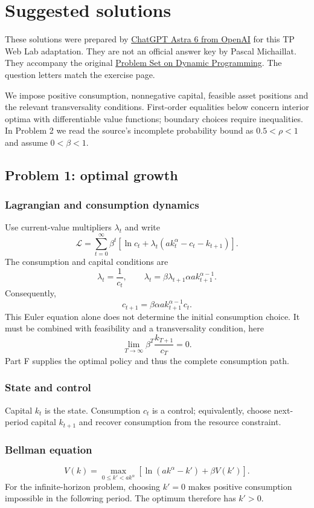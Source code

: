 \usepackage{hyperref}
\renewcommand{\thesubsubsection}{\Alph{subsubsection}}
\section*{Suggested solutions}
These solutions were prepared by \href{https://openai.com/index/gpt-6-astra/}{ChatGPT Astra 6 from OpenAI} for this TP Web Lab adaptation. 
They are not an official answer key by Pascal Michaillat. 
They accompany the original \href{ps1.tex}{Problem Set on Dynamic Programming}. 
The question letters match the exercise page.

We impose positive consumption, nonnegative capital, feasible asset positions and the relevant transversality conditions. First-order equalities below concern interior optima with differentiable value functions; boundary choices require inequalities. In Problem 2 we read the source's incomplete probability bound as $0.5<\rho<1$ and assume $0<\beta<1$.

\subsection*{Problem 1: optimal growth}
\setcounter{subsubsection}{0}
\subsubsection{Lagrangian and consumption dynamics}
Use current-value multipliers $\lambda_t$ and write
\[
\mathcal{L}=\sum_{t=0}^{\infty}\beta^t\left[\ln c_t+\lambda_t(a k_t^{\alpha}-c_t-k_{t+1})\right].
\]
The consumption and capital conditions are
\[
\lambda_t=\frac{1}{c_t},\qquad
\lambda_t=\beta\lambda_{t+1}\alpha a k_{t+1}^{\alpha-1}.
\]
Consequently,
\[
c_{t+1}=\beta\alpha a k_{t+1}^{\alpha-1}c_t.
\]
This Euler equation alone does not determine the initial consumption choice. It must be combined with feasibility and a transversality condition, here
\[
\lim_{T\to\infty}\beta^T\frac{k_{T+1}}{c_T}=0.
\]
Part F supplies the optimal policy and thus the complete consumption path.

\subsubsection{State and control}
Capital $k_t$ is the state. Consumption $c_t$ is a control; equivalently, choose next-period capital $k_{t+1}$ and recover consumption from the resource constraint.

\subsubsection{Bellman equation}
\[
V(k)=\max_{0\leq k'<a k^{\alpha}}\left[\ln(a k^{\alpha}-k')+\beta V(k')\right].
\]
For the infinite-horizon problem, choosing $k'=0$ makes positive consumption impossible in the following period. The optimum therefore has $k'>0$.

